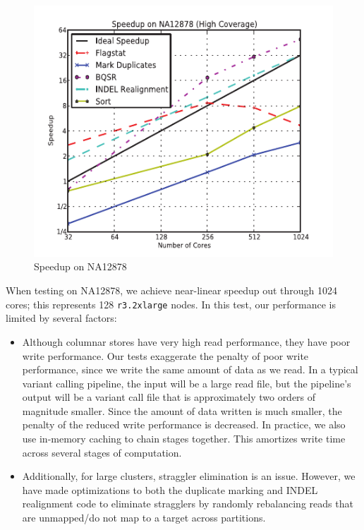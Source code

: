 \documentclass{sig-alternate}
\begin{document}
\begin{figure}[h]
\begin{center}
\includegraphics{graphs/speedup_na12878.pdf}
\end{center}
\caption{Speedup on NA12878}
\label{fig:speedup}
\end{figure}

When testing on NA12878, we achieve near-linear speedup out through 1024 cores; this represents 128
\texttt{r3.2xlarge} \linebreak nodes. In this test, our performance is limited by several factors:

\begin{itemize}
\item Although columnar stores have very high read performance, they have poor write performance. Our
tests exaggerate the penalty of poor write performance, since we write the same amount of data as we read. In a typical
variant calling pipeline, the input will be a large read file, but the pipeline's output will be a
variant call file that is approximately two orders of magnitude smaller. Since the amount of data written is much smaller,
the penalty of the reduced write performance is decreased. In practice, we also use in-memory caching to chain stages
together. This amortizes write time across several stages of computation.
\item Additionally, for large clusters, straggler elimination is an issue. However, we have made optimizations to
both the duplicate marking and INDEL realignment code to eliminate stragglers by randomly
rebalancing reads that are unmapped/do not map to a target across partitions.
\end{itemize}
\end{document}
